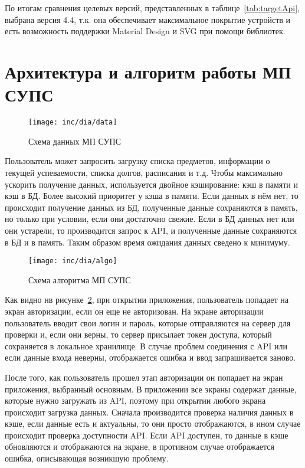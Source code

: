 По итогам сравнения целевых версий, представленных в таблице~\ref{tab:targetApi}, выбрана версия 4.4, т.к. она обеспечивает максимальное покрытие устройств и есть возможность поддержки Material Design и SVG при помощи библиотек.

\section{Архитектура и алгоритм работы МП СУПС}
\label{sec:architecture}

\begin{figure}[ht]
  \texttt{[image: inc/dia/data]}
  \caption{Схема данных МП СУПС}
  \label{fig:data}
\end{figure}

Пользователь может запросить загрузку списка предметов, информации о текущей успеваемости, списка долгов, расписания и т.д.
Чтобы максимально ускорить получение данных, используется двойное кэширование: кэш в памяти и кэш в БД.
Более высокий приоритет у кэша в памяти.
Если данных в нём нет, то происходит получение данных из БД, полученные данные сохраняются в память, но только при условии, если они достаточно свежие.
Если в БД данных нет или они устарели, то производится запрос к API, и полученные данные сохраняются в БД и в память.
Таким образом время ожидания данных сведено к минимуму.

\begin{figure}[ht]
  \texttt{[image: inc/dia/algo]}
  \caption{Схема алгоритма МП СУПС}
  \label{fig:algo}
\end{figure}

Как видно нв рисунке~\ref{fig:algo}, при открытии приложения, пользователь попадает на экран авторизации, если он еще не авторизован.
На экране авторизации пользователь вводит свои логин и пароль, которые отправляются на сервер для проверки и, если они верны, то сервер присылает токен доступа, который сохраняется в локальное хранилище.
В случае проблем соединения с API или если данные входа неверны, отображается ошибка и ввод запрашивается заново.

После того, как пользователь прошел этап авторизации он попадает на экран приложения, выбранный основным.
В приложении все экраны содержат данные, которые нужно загружать из API, поэтому при открытии любого экрана происходит загрузка данных.
Сначала производится проверка наличия данных в кэше, если данные есть и актуальны, то они просто отображаются, в ином случае происходит проверка доступности API\@.
Если API доступен, то данные в кэше обновляются и отображаются на экране, в противном случае отображается ошибка, описывающая возникшую проблему.

